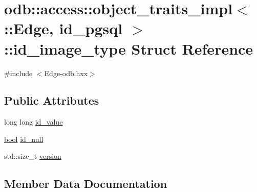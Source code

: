 \hypertarget{structodb_1_1access_1_1object__traits__impl_3_01_1_1_edge_00_01id__pgsql_01_4_1_1id__image__type}{}\section{odb\+:\+:access\+:\+:object\+\_\+traits\+\_\+impl$<$ \+:\+:Edge, id\+\_\+pgsql $>$\+:\+:id\+\_\+image\+\_\+type Struct Reference}
\label{structodb_1_1access_1_1object__traits__impl_3_01_1_1_edge_00_01id__pgsql_01_4_1_1id__image__type}


{\ttfamily \#include $<$Edge-\/odb.\+hxx$>$}

\subsection*{Public Attributes}
\begin{DoxyCompactItemize}
\item 
long long \hyperlink{structodb_1_1access_1_1object__traits__impl_3_01_1_1_edge_00_01id__pgsql_01_4_1_1id__image__type_a9774107a1509c50c04542cd47c0ad857}{id\+\_\+value}
\item 
\hyperlink{classodb_1_1access_1_1object__traits_3_01_1_1_edge_01_4_a16e9c480b5803d3dd980cd934f04dd7b}{bool} \hyperlink{structodb_1_1access_1_1object__traits__impl_3_01_1_1_edge_00_01id__pgsql_01_4_1_1id__image__type_a73c0975227921eb1c048179e79a1cae7}{id\+\_\+null}
\item 
std\+::size\+\_\+t \hyperlink{structodb_1_1access_1_1object__traits__impl_3_01_1_1_edge_00_01id__pgsql_01_4_1_1id__image__type_a51b03036a168890325b701847c17dab3}{version}
\end{DoxyCompactItemize}


\subsection{Member Data Documentation}
\hypertarget{structodb_1_1access_1_1object__traits__impl_3_01_1_1_edge_00_01id__pgsql_01_4_1_1id__image__type_a73c0975227921eb1c048179e79a1cae7}{}
